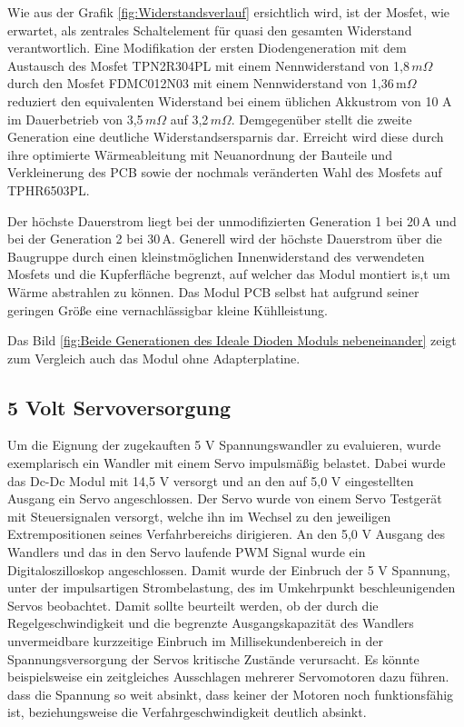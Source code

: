 Wie aus der Grafik \ref{fig:Widerstandsverlauf} ersichtlich wird, ist der Mosfet, wie erwartet, als zentrales Schaltelement für quasi den gesamten Widerstand verantwortlich.
Eine Modifikation der ersten Diodengeneration mit dem Austausch des Mosfet TPN2R304PL mit einem Nennwiderstand von 1,8\,$m\Omega$ \cite{TPN2R304PL} durch den Mosfet FDMC012N03 mit einem Nennwiderstand von 1,36\,m$\Omega$ \cite{FDMC012N03} reduziert den equivalenten Widerstand bei einem üblichen Akkustrom von 10 A im Dauerbetrieb von 3,5\,$m\Omega$  auf 3,2\,$m\Omega$.
Demgegenüber stellt die zweite Generation eine deutliche Widerstandsersparnis dar.
Erreicht wird diese durch ihre optimierte Wärmeableitung mit Neuanordnung der Bauteile und Verkleinerung des PCB sowie der nochmals veränderten Wahl des Mosfets auf TPHR6503PL.

Der höchste Dauerstrom liegt bei der unmodifizierten Generation 1 bei 20\,A und bei der Generation 2 bei 30\,A. 
Generell wird der höchste Dauerstrom über die Baugruppe durch einen kleinstmöglichen Innenwiderstand des verwendeten Mosfets und die Kupferfläche begrenzt, auf welcher das Modul montiert is,t um Wärme abstrahlen zu können. Das Modul PCB selbst hat aufgrund seiner geringen Größe eine vernachlässigbar kleine Kühlleistung.

Das Bild \ref{fig:Beide Generationen des Ideale Dioden Moduls nebeneinander} zeigt zum Vergleich auch das Modul ohne Adapterplatine.

\subsection{5 Volt Servoversorgung}

Um die Eignung der zugekauften 5 V Spannungswandler zu evaluieren, wurde exemplarisch ein Wandler mit einem Servo impulsmäßig belastet.
Dabei wurde das Dc-Dc Modul mit 14,5 V versorgt und an den auf 5,0 V eingestellten Ausgang ein Servo angeschlossen. Der Servo wurde von einem Servo Testgerät mit Steuersignalen versorgt, welche ihn im Wechsel zu den jeweiligen Extrempositionen seines Verfahrbereichs dirigieren. 
An den 5,0 V Ausgang des Wandlers und das in den Servo laufende PWM Signal wurde ein  Digitaloszilloskop angeschlossen. Damit  wurde der Einbruch der 5 V Spannung, unter der impulsartigen Strombelastung, des im Umkehrpunkt beschleunigenden Servos beobachtet.
Damit sollte beurteilt werden, ob der durch die Regelgeschwindigkeit und die begrenzte Ausgangskapazität des Wandlers unvermeidbare kurzzeitige Einbruch im Millisekundenbereich in der Spannungsversorgung der Servos kritische Zustände verursacht.
Es könnte beispielsweise ein zeitgleiches Ausschlagen mehrerer Servomotoren dazu führen. dass die Spannung so weit absinkt, dass keiner der Motoren noch funktionsfähig ist, beziehungsweise die Verfahrgeschwindigkeit deutlich absinkt.

